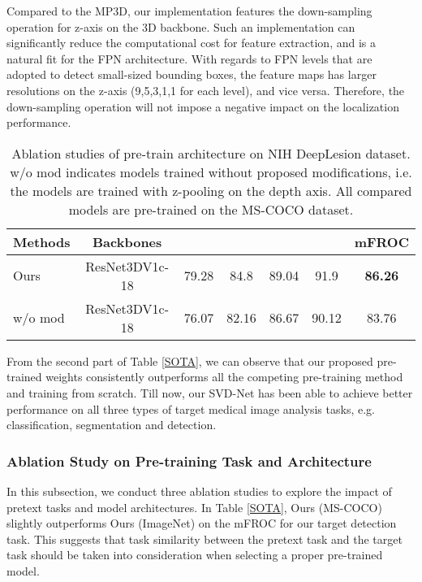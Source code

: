 \documentclass[journal,twoside,web]{ieeecolor}
\begin{document}
Compared to the MP3D, our implementation features the down-sampling operation for z-axis on the 3D backbone. Such an implementation can significantly reduce the computational cost for feature extraction, and is a natural fit for the FPN architecture. With regards to FPN levels that are adopted to detect small-sized bounding boxes, the feature maps has larger resolutions on the z-axis (9,5,3,1,1 for each level), and vice versa. Therefore, the down-sampling operation will not impose a negative impact on the localization performance. 

\begin{table}[!t]
\setlength{\belowcaptionskip}{5pt}
    \caption{Ablation studies of pre-train architecture on NIH DeepLesion dataset. w/o mod indicates models trained without proposed modifications, i.e. the models are trained with z-pooling on the depth axis. All compared models are pre-trained on the MS-COCO dataset.}
\label{ablation}
    \centering
    \footnotesize \setlength{\tabcolsep}{4pt}\renewcommand{\arraystretch}{1.2}\centering
        \begin{tabular}{lcccccc}
            \toprule
            \textbf{Methods} & \textbf{Backbones} &   &  &  &  & \textbf{mFROC} \\
            \midrule
            Ours & ResNet3DV1c-18 & 79.28 & 84.8 & 89.04 & 91.9 & \textbf{86.26}  \\
            w/o mod & ResNet3DV1c-18 &  76.07 & 82.16 & 86.67 & 90.12 & 83.76  \\ \bottomrule
\end{tabular}
\end{table}


From the second part of Table \ref{SOTA}, we can observe that our proposed pre-trained weights consistently outperforms all the competing pre-training method and training from scratch. Till now, our SVD-Net has been able to achieve better performance on all three types of target medical image analysis tasks, e.g. classification, segmentation and detection. 


\subsubsection{Ablation Study on Pre-training Task and Architecture}
In this subsection, we conduct three ablation studies to explore the impact of pretext tasks and model architectures. In Table \ref{SOTA}, Ours (MS-COCO) slightly outperforms Ours (ImageNet) on the mFROC for our target detection task. This suggests that task similarity between the pretext task and the target task should be taken into consideration when selecting a proper pre-trained model. 
\end{document}
